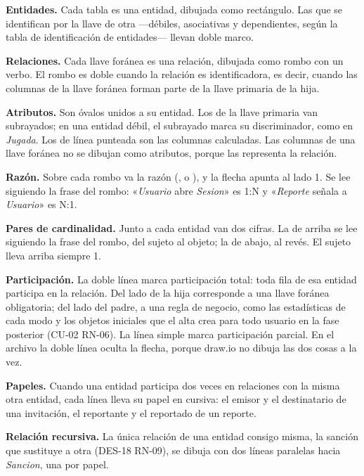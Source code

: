 \begin{reglas}
  \item \textbf{Entidades.} Cada tabla es una entidad, dibujada como rectángulo. Las que se identifican por la llave de otra ---débiles, asociativas y dependientes, según la tabla de identificación de entidades--- llevan doble marco.
  \item \textbf{Relaciones.} Cada llave foránea es una relación, dibujada como rombo con un verbo. El rombo es doble cuando la relación es identificadora, es decir, cuando las columnas de la llave foránea forman parte de la llave primaria de la hija.
  \item \textbf{Atributos.} Son óvalos unidos a su entidad. Los de la llave primaria van subrayados; en una entidad débil, el subrayado marca su discriminador, como  en \textit{Jugada}. Los de línea punteada son las columnas calculadas. Las columnas de una llave foránea no se dibujan como atributos, porque las representa la relación.
  \item \textbf{Razón.} Sobre cada rombo va la razón (,  o ), y la flecha apunta al lado 1. Se lee siguiendo la frase del rombo: «\textit{Usuario} abre \textit{Sesion}» es 1:N y «\textit{Reporte} señala a \textit{Usuario}» es N:1.
  \item \textbf{Pares de cardinalidad.} Junto a cada entidad van dos cifras. La de arriba se lee siguiendo la frase del rombo, del sujeto al objeto; la de abajo, al revés. El sujeto lleva arriba siempre 1.
  \item \textbf{Participación.} La doble línea marca participación total: toda fila de esa entidad participa en la relación. Del lado de la hija corresponde a una llave foránea obligatoria; del lado del padre, a una regla de negocio, como las estadísticas de cada modo y los objetos iniciales que el alta crea para todo usuario en la fase posterior (\mbox{CU-02} \mbox{RN-06}). La línea simple marca participación parcial. En el archivo  la doble línea oculta la flecha, porque draw.io no dibuja las dos cosas a la vez.
  \item \textbf{Papeles.} Cuando una entidad participa dos veces en relaciones con la misma otra entidad, cada línea lleva su papel en cursiva: el emisor y el destinatario de una invitación, el reportante y el reportado de un reporte.
  \item \textbf{Relación recursiva.} La única relación de una entidad consigo misma, la sanción que sustituye a otra (\mbox{DES-18} \mbox{RN-09}), se dibuja con dos líneas paralelas hacia \textit{Sancion}, una por papel.
\end{reglas}

